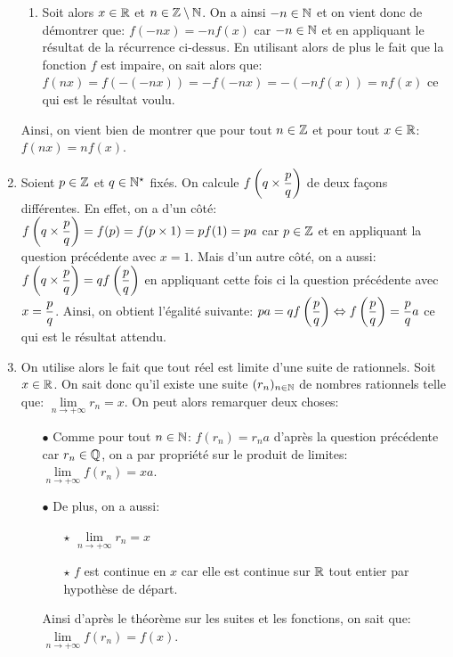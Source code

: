\documentclass[a4paper, 11pt,reqno]{article}
\begin{document}
\begin{correction}
\begin{enumerate}
\begin{enumerate}
			      \item Soit alors $x\in\mathbb{R}$ et $n\in\mathbb{Z}\setminus\mathbb{N}$. On a ainsi $-n\in\mathbb{N}$ et on vient donc de d\'emontrer que: $f(-nx)=-nf(x)$ car $-n\in\mathbb{N}$ et en appliquant le r\'esultat de la r\'ecurrence ci-dessus. En utilisant alors de plus le fait que la fonction $f$ est impaire, on sait alors que: $f(nx)=f(-(-nx))=-f(-nx)=-( -nf(x) )=nf(x)$ ce qui est le r\'esultat  voulu.
		      \end{enumerate}
		      Ainsi, on vient bien de montrer que pour tout $n\in\mathbb{Z}$ et pour tout $x\in\mathbb{R}$: $f(nx)=nf(x)$.
		\item Soient $p\in\mathbb{Z}$ et $q\in\mathbb{N}^{\star}$ fix\'es. On calcule $f\left( q\times \displaystyle\frac{p}{q}\right)$ de deux fa\c{c}ons diff\'erentes. En effet, on a d'un c\^{o}t\'e: $f\left( q\times \displaystyle\frac{p}{q}\right)=f(p)=f(p\times 1)=pf(1)=p a$ car $p\in\mathbb{Z}$ et en appliquant la question pr\'ec\'edente avec $x=1$. Mais d'un autre c\^{o}t\'e, on a aussi: $f\left( q\times \displaystyle\frac{p}{q}\right)=qf\left(\displaystyle\frac{p}{q}\right)$ en appliquant cette fois ci la question pr\'ec\'edente avec $x=\displaystyle\frac{p}{q}$. Ainsi, on obtient l'\'egalit\'e suivante: $p a=q f\left(\displaystyle\frac{p}{q}\right) \Leftrightarrow f\left(\displaystyle\frac{p}{q}\right)=\displaystyle\frac{p}{q} a$ ce qui est le r\'esultat attendu.
		\item On utilise alors le fait que tout r\'eel est limite d'une suite de rationnels. Soit $x\in\mathbb{R}$. On sait donc qu'il existe une suite $(r_n)_{n\in\mathbb{N}}$ de nombres rationnels telle que: $\lim\limits_{n\to +\infty} r_n=x$. On peut alors remarquer deux choses:
		      \begin{itemize}
			      \item[$\bullet$] Comme pour tout $n\in\mathbb{N}$: $f(r_n)=r_n a$ d'apr\`{e}s la question pr\'ec\'edente car $r_n\in\mathbb{Q}$, on a par propri\'et\'e sur le produit de limites: $\lim\limits_{n\to +\infty} f(r_n)=xa$.
			      \item[$\bullet$] De plus, on a aussi:
			            \begin{itemize}
				            \item[$\star$] $\lim\limits_{n\to +\infty} r_n=x$
				            \item[$\star$] $f$ est continue en $x$ car elle est continue sur $\mathbb{R}$ tout entier par hypoth\`{e}se de d\'epart.
			            \end{itemize}
			            Ainsi d'apr\`{e}s le th\'eor\`{e}me sur les suites et les fonctions, on sait que: $\lim\limits_{n\to +\infty} f(r_n)=f(x)$.
		      \end{itemize}

\end{enumerate}
\end{correction}
\end{document}
